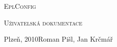 \newpage
\thispagestyle{empty}
\begin{titlepage}

\vspace*{\fill}

\begin{center}

\textsc {\LARGE EplConfig}

\vspace{1cm}

\textsc {\Large Uživatelská dokumentace}
\end{center}

\vspace*{\fill}

Plzeň, 2010Roman Pišl, Jan Krčmář
\end{titlepage}
